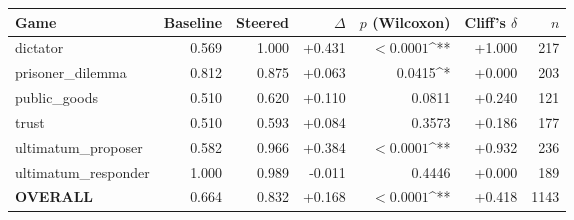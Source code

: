 \begin{tabular}{lrrrrrr}
\toprule
Game & Baseline & Steered & $\Delta$ & $p$ (Wilcoxon) & Cliff's $\delta$ & $n$ \\
\midrule
dictator & 0.569 & 1.000 & +0.431 & $<0.0001$^{**} & +1.000 & 217 \\
prisoner_dilemma & 0.812 & 0.875 & +0.063 & 0.0415^{*} & +0.000 & 203 \\
public_goods & 0.510 & 0.620 & +0.110 & 0.0811 & +0.240 & 121 \\
trust & 0.510 & 0.593 & +0.084 & 0.3573 & +0.186 & 177 \\
ultimatum_proposer & 0.582 & 0.966 & +0.384 & $<0.0001$^{**} & +0.932 & 236 \\
ultimatum_responder & 1.000 & 0.989 & -0.011 & 0.4446 & +0.000 & 189 \\
\textbf{OVERALL} & 0.664 & 0.832 & +0.168 & $<0.0001$^{**} & +0.418 & 1143 \\
\bottomrule
\end{tabular}
